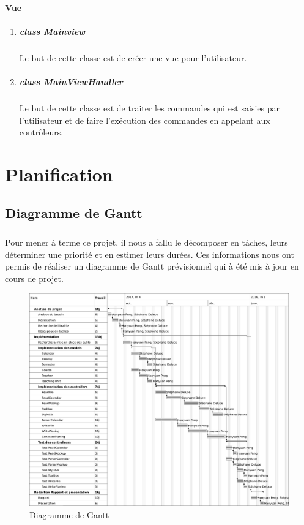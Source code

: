 \documentclass{polytech/polytech}
\begin{document}
	\subsubsection{Vue}
	\begin{enumerate}
		\item \paragraph{class Mainview}
		Le but de cette classe est de créer une vue pour l'utilisateur.

		\item \paragraph{class MainViewHandler}
		Le but de cette classe est de traiter les commandes qui est saisies par l'utilisateur et de faire l'exécution des commandes en appelant aux contrôleurs.
	\end{enumerate}
	\chapter{Planification}

	\section{Diagramme de Gantt}

	\paragraph{}
	Pour mener à terme ce projet, il nous a fallu le décomposer en tâches, leurs déterminer une priorité et en estimer leurs durées.
	Ces informations nous ont permis de réaliser un diagramme de Gantt prévisionnel qui à été mis à jour en cours de projet.

	\begin{figure}
		\caption{Diagramme de Gantt}
		\includegraphics[width=13.5cm]{./img/Gantt.png}
	\end{figure}
\end{document}
